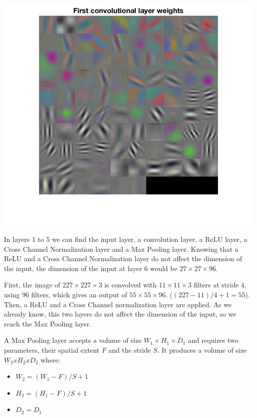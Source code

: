 \documentclass[10pt]{article}
\begin{document}
\begin{multicols}{2}
  
     \begin{center}
	\includegraphics[width=\linewidth]{img/layerweights}
      \end{center}

      In layers 1 to 5 we can find the input layer, a convolution layer, a ReLU layer,
      a Cross Channel Normalization layer and a Max Pooling layer. Knowing that
      a ReLU and a Cross Channel Normalization layer do not affect the dimension of the input,
      the dimension of the input at layer 6 would be  $27 \times 27 \times 96$.
      
      First, the image of $227 \times 227 \times 3$ is convolved with $11 \times 11 \times 3$
      filters at stride 4, using 96 filters,
      which gives an output of $55 \times 55 \times 96$. ($(227-11)/4+1 = 55$).
      Then, a ReLU and a Cross Channel normalization layer are applied. As we already know,
      this two layers do not affect the dimension of the input, so we reach the Max Pooling layer.

      A Max Pooling layer accepts a volume of size $W_{1} \times H_{1} \times D_{1}$ and requires two
      parameters, their spatial extent $F$ and the stride $S$.
      It produces a volume of size $W_{2} x H_{2} x D_{2}$ where:
      \begin{itemize}
        \item $W_{2} = (W_{1} - F) / S + 1$
        \item $H_{2} = (H_{1} - F) / S + 1$
        \item $D_{2} = D_{1}$
     \end{itemize}


\end{multicols}
\end{document}
